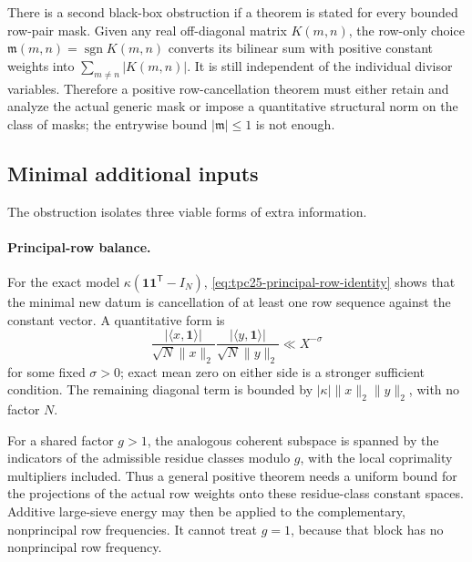 There is a second black-box obstruction if a theorem is stated for
every bounded row-pair mask.  Given any real off-diagonal matrix
\(K(m,n)\), the row-only choice
\(\mathfrak m(m,n)=\operatorname{sgn}K(m,n)\) converts its bilinear sum
with positive constant weights into \(\sum_{m\ne n}|K(m,n)|\).  It is
still independent of the individual divisor variables.  Therefore a
positive row-cancellation theorem must either retain and analyze the
actual generic mask or impose a quantitative structural norm on the
class of masks; the entrywise bound \(|\mathfrak m|\le1\) is not enough.

\subsection{Minimal additional inputs}

The obstruction isolates three viable forms of extra information.

\paragraph{Principal-row balance.}
For the exact model \(\kappa(\mathbf1\mathbf1^{\mathsf T}-I_N)\),
\eqref{eq:tpc25-principal-row-identity} shows that the minimal new datum
is cancellation of at least one row sequence against the constant
vector.  A quantitative form is
\begin{equation}
 \frac{|\langle x,\mathbf1\rangle|}
 {\sqrt N\|x\|_2}
 \frac{|\langle y,\mathbf1\rangle|}
 {\sqrt N\|y\|_2}
 \ll X^{-\sigma}
 \label{eq:tpc25-principal-balance}
\end{equation}
for some fixed \(\sigma>0\); exact mean zero on either side is a
stronger sufficient condition.  The remaining diagonal term is bounded
by \(|\kappa|\|x\|_2\|y\|_2\), with no factor \(N\).

For a shared factor \(g>1\), the analogous coherent subspace is spanned
by the indicators of the admissible residue classes modulo \(g\), with
the local coprimality multipliers included.  Thus a general positive
theorem needs a uniform bound for the projections of the actual row
weights onto these residue-class constant spaces.  Additive large-sieve
energy may then be applied to the complementary, nonprincipal row
frequencies.  It cannot treat \(g=1\), because that block has no
nonprincipal row frequency.

